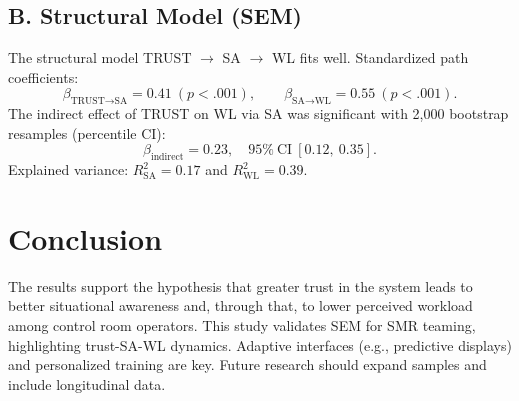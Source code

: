 \documentclass[conference]{IEEEtran}
\begin{document}
\begin{table}[t]
\subsection{B. Structural Model (SEM)}
The structural model TRUST $\rightarrow$ SA $\rightarrow$ WL fits well. Standardized path coefficients: 
\[
\beta_{\text{TRUST}\to\text{SA}}=0.41\ (p<.001),\qquad
\beta_{\text{SA}\to\text{WL}}=0.55\ (p<.001).
\]
The indirect effect of TRUST on WL via SA was significant with 2,000 bootstrap resamples (percentile CI):
\[
\beta_{\text{indirect}}=0.23,\quad 95\%\ \text{CI}\ [0.12,\ 0.35].
\]
Explained variance: $R^2_{\text{SA}}=0.17$ and $R^2_{\text{WL}}=0.39$.

\section{Conclusion}
The results support the hypothesis that greater trust in the system leads to better situational awareness and, through that, to lower perceived workload among control room operators.
This study validates SEM for SMR teaming, highlighting trust-SA-WL dynamics. Adaptive interfaces (e.g., predictive displays) and personalized training are key. Future research should expand samples and include longitudinal data.\\
\\



\\
\\ 
\\
\\
\\

\\


\\
\\
\\
\\
\\
\\
\\

\begin{thebibliography}{54}\\ \\\\


\\
\\

\\
\\
\\


\end{thebibliography}
\end{table}
\end{document}
